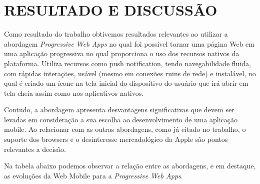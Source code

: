 \section{\esp RESULTADO E DISCUSSÃO}
Como resultado do trabalho obtivemos resultados relevantes ao utilizar a abordagem \textit{Progressive Web Apps} no qual foi possível tornar uma página Web em uma aplicação progressiva no qual proporciona o uso dos recursos nativos da plataforma. Utiliza recursos como push notification, tendo navegabilidade fluida, com rápidas interações, usável (mesmo em conexões ruins de rede) e instalável, no qual é criado um ícone na tela inicial do dispositivo do usuário que irá abrir em tela cheia assim como nos aplicativos nativos.

Contudo, a abordagem apresenta desvantagens significativas que devem ser levadas em consideração a sua escolha ao desenvolvimento de uma aplicação mobile. Ao relacionar com as outras abordagens, como já citado  no trabalho, o suporte dos browsers e o desinteresse mercadológico da Apple são pontos relevantes a decisão.

Na tabela abaixo podemos observar a relação entre as abordagens, e em destaque, as evoluções da Web  Mobile para a \textit{Progressive Web Apps}.


